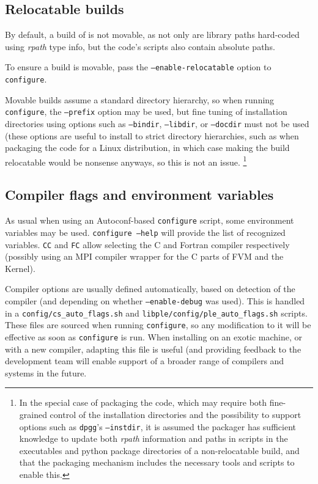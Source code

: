 \documentclass[a4paper,10pt,twoside]{csshortdoc}
\begin{document}
\subsection{Relocatable builds\label{sec:config:relocatable}}

By default, a build of \CS is not movable, as not only
are library paths hard-coded using \emph{rpath} type info,
but the code's scripts also contain absolute paths.

To ensure a build is movable, pass the \texttt{--enable-relocatable} option
to {\tt configure}.

Movable builds assume a standard directory hierarchy, so when running
{\tt configure}, the \texttt{--prefix} option may be used, but fine tuning
of installation directories using options such as \texttt{--bindir},
\texttt{--libdir}, or \texttt{--docdir} must not be used
(these options are useful to install to strict directory hierarchies,
such as when packaging the code for a Linux distribution,
in which case making the build relocatable would be nonsense anyways,
so this is not an issue.
\footnote{In the special case of packaging the code, which
may require both fine-grained control of the installation directories
and the possibility to support options such as \texttt{dpgg}'s
\texttt{--instdir}, it is assumed the packager has sufficient knowledge to
update both \emph{rpath} information and paths in scripts in the executables
and python package directories of a non-relocatable build, and that the
packaging mechanism includes the necessary tools and scripts to enable this.}

\subsection{Compiler flags and environment variables\label{sec:config:flags}}

As usual when using an Autoconf-based \texttt{configure} script,
some environment variables may be used. \texttt{configure --help}
will provide the list of recognized variables.
\texttt{CC} and \texttt{FC} allow selecting the C and Fortran compiler
respectively (possibly using an MPI compiler wrapper for the C parts
of FVM and the Kernel).

Compiler options are usually defined automatically, based on
detection of the compiler (and depending on whether \texttt{--enable-debug}
was used). This is handled in a \texttt{config/cs\_auto\_flags.sh}
and \texttt{libple/config/ple\_auto\_flags.sh} scripts.
These files are sourced when running \texttt{configure}, so
any modification to it will be effective as soon as \texttt{configure} is run.
When installing on an exotic machine, or with a new compiler, adapting this
file is useful (and providing feedback to the \CS development team
will enable support of a broader range of compilers and systems in the
future.
\end{document}
